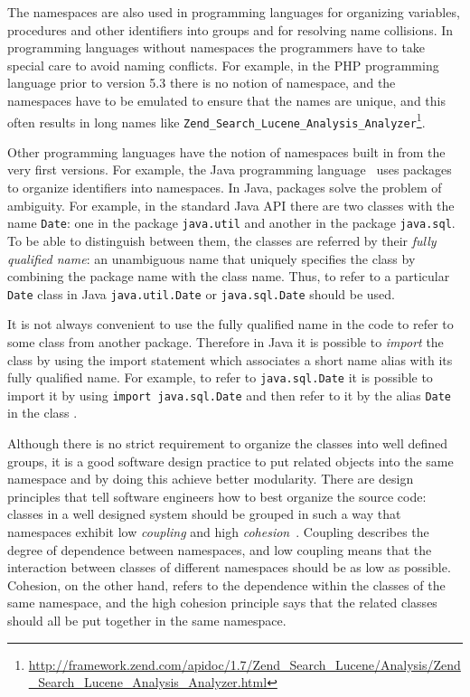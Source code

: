 The namespaces are also used in programming languages for organizing
variables, procedures and other identifiers into groups and
for resolving name collisions. In programming languages without
namespaces the programmers have to take special care to avoid
naming conflicts. For example, in the PHP programming language
prior to version 5.3 \cite{mcarthur2008php6} there is no notion of namespace, and
the namespaces have to be emulated to ensure that the names
are unique, and this often results in long names like
\verb|Zend_Search_Lucene_Analysis_Analyzer|\footnote{\url{http://framework.zend.com/apidoc/1.7/Zend_Search_Lucene/Analysis/Zend_Search_Lucene_Analysis_Analyzer.html}}.


Other programming languages have the notion of namespaces built in
from the very first versions. For example, the Java programming
language~\cite{gosling2014java} uses packages to organize identifiers into
namespaces. In Java, packages solve the problem of ambiguity. For example,
in the standard Java API there are two classes with the name \texttt{Date}:
one in the package \texttt{java.util} and another in the package \texttt{java.sql}.
To be able to distinguish between them, the classes are referred by their
\emph{fully qualified name}: an unambiguous name that uniquely specifies the class
by combining the package name with the class name. Thus, to refer to a particular
\texttt{Date} class in Java  \texttt{java.util.Date} or  \texttt{java.sql.Date}
should be used. 

It is not always convenient to use the fully qualified name in the code to
refer to some class from another package. Therefore in Java it is possible to
\emph{import} the class by using the import statement which associates
a short name alias with its fully qualified name.
For example, to refer to \texttt{java.sql.Date} it is possible to import
it by using \texttt{import java.sql.Date} and then refer to it by the alias
\texttt{Date} in the class \cite{gosling2014java}.


Although there is no strict requirement to organize the classes into
well defined groups, it is a good software design practice to put
related objects into the same namespace and by doing this achieve
better modularity. There are design principles that tell software engineers
how to best organize the source code: classes in a well designed system
should be grouped in such a way that namespaces
exhibit low \emph{coupling} and high \emph{cohesion}~\cite{larman2005applying}.
Coupling describes the degree of dependence between namespaces, and
low coupling means that the interaction between classes of different
namespaces should be as low as possible. Cohesion, on the other hand,
refers to the dependence within the classes of the same namespace,
and the high cohesion principle says that the related classes
should all be put together in the same namespace.


